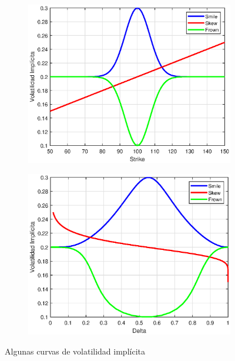 \begin{figure}[H]
    \centering
    \begin{subfigure}[b]{0.45\linewidth}
        \includegraphics[width=\linewidth]{Imagenes/6_Sols/IV_vs_Strike.eps}
    \end{subfigure}
    \begin{subfigure}[b]{0.45\linewidth}
        \includegraphics[width=\linewidth]{Imagenes/6_Sols/IV_vs_Delta.eps}
    \end{subfigure}
    \caption{Algunas curvas de volatilidad implícita}
\end{figure}






